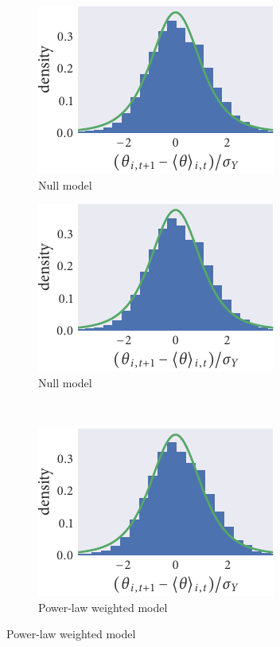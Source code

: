 \begin{figure}
  \begin{subfigure}[b]{0.33333\textwidth}
    \caption{Null model}
    \includegraphics{seq1/null_residuals.pdf}
  \end{subfigure}\hspace{2pt}
  \begin{subfigure}[b]{0.33333\textwidth}
    \caption{Null model}
    \includegraphics{seq1/null_residuals.pdf}
  \end{subfigure}\vspace{1em}\\
  \begin{subfigure}[b]{0.33333\textwidth}
    \includegraphics{seq1/power_residuals.pdf}
    \caption{Power-law weighted model}

\end{subfigure}
\end{figure}
